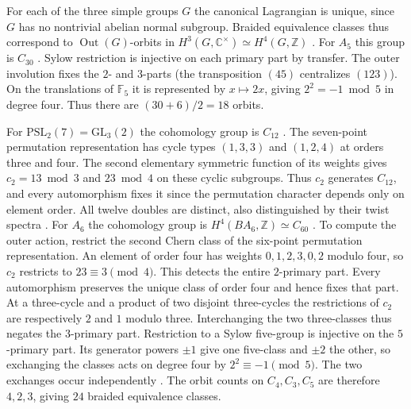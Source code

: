 \documentclass[11pt]{amsart}
\numberwithin{equation}{section}
\theoremstyle{definition}
\theoremstyle{plain}
\begin{document}
For each of the three simple groups $G$ the canonical Lagrangian is unique, since
$G$ has no nontrivial abelian normal subgroup. Braided equivalence
classes thus correspond to $\operatorname{Out}(G)$-orbits in
$H^3(G,\mathbb C^\times)\simeq H^4(G,\mathbb Z)$
\cite[Theorem~1.2 and Corollary~1.5]{NNLagrangian}.
For $A_5$ this group is $C_{30}$ \cite[p.~355]{EckmannHilton}.
Sylow restriction is injective on each primary part by transfer.
The outer involution \cite{AtlasA5} fixes the $2$- and $3$-parts
(the transposition $(45)$ centralizes $(123)$). On the translations
of $\mathbb F_5$ it is represented by $x\mapsto2x$, giving
$2^2=-1\bmod5$ in degree four. Thus there are $(30+6)/2=18$ orbits.

For $\mathrm{PSL}_2(7)=\mathrm{GL}_3(2)$ the cohomology group is
$C_{12}$ \cite[Lemma~4.1]{JFT}. The seven-point permutation
representation has cycle types $(1,3,3)$ and $(1,2,4)$ at orders three
and four. The second elementary symmetric function of its weights
gives $c_2=13\bmod3$ and $23\bmod4$ on these cyclic subgroups.
Thus $c_2$ generates $C_{12}$, and every automorphism fixes it since
the permutation character depends only on element order. All twelve
doubles are distinct, also distinguished by their twist spectra
\cite[\S\S3--4, \href{https://tqft.net/web/research/students/AngusGruen/Modular_Data/168/42/}{entry $(168,42)$}]{GruenMorrison}.
For $A_6$ the cohomology group is $H^4(BA_6,\mathbb Z)\simeq C_{60}$
\cite[calculation for $A_6$, p.~46 of the extended version]{HKY243}.
To compute the outer action, restrict the second Chern class of the
six-point permutation representation. An element of order four has
weights $0,1,2,3,0,2$ modulo four, so $c_2$ restricts to
$23\equiv3\pmod4$. This detects the entire $2$-primary part. Every
automorphism preserves the unique class of order four and hence fixes
that part. At a three-cycle and a product of two disjoint three-cycles
the restrictions of $c_2$ are respectively $2$ and $1$ modulo three.
Interchanging the two three-classes thus negates the $3$-primary part.
Restriction to a Sylow five-group is injective on the $5$-primary
part. Its generator powers $\pm1$ give one five-class and $\pm2$ the
other, so exchanging the classes acts on degree four by
$2^2\equiv-1\pmod5$. The two exchanges occur independently
\cite[Lemma~2.1]{KOZA6}. The orbit counts on $C_4,C_3,C_5$ are therefore
$4,2,3$, giving $24$ braided equivalence classes.
\end{document}
